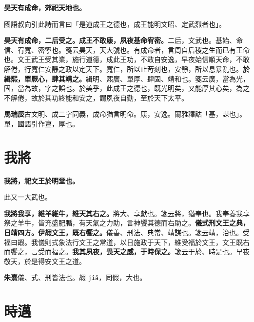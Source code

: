 
\textbf{昊天有成命，郊祀天地也。}

\begin{quoting}國語叔向引此詩而言曰「是道成王之德也，成王能明文昭、定武烈者也」。\end{quoting}

\textbf{昊天有成命，二后受之。成王不敢康，夙夜基命宥密。}{\footnotesize 二后，文武也。基始、命信、宥寬、密寧也。箋云昊天，天大號也。有成命者，言周自后稷之生而已有王命也。文王武王受其業，施行道德，成此王功，不敢自安逸，早夜始信順天命，不敢解倦，行寬仁安靜之政以定天下。寬仁，所以止苛刻也，安靜，所以息暴亂也。}\textbf{於緝熙，單厥心，肆其靖之。}{\footnotesize 緝明、熙廣、單厚、肆固、靖和也。箋云廣，當為光，固，當為故，字之誤也。於美乎，此成王之德也，既光明矣，又能厚其心矣，為之不解倦，故於其功終能和安之，謂夙夜自勤，至於天下太平。}

\begin{quoting}\textbf{馬瑞辰}古文明、成二字同義，成命猶言明命。康，安逸。爾雅釋詁「基，謀也」。單，國語引作亶，厚也。\end{quoting}

\section{我將}


\textbf{我將，祀文王於明堂也。}

\begin{quoting}此又一大武也。\end{quoting}

\textbf{我將我享，維羊維牛，維天其右之。}{\footnotesize 將大、享獻也。箋云將，猶奉也。我奉養我享祭之羊牛，皆充盛肥腯，有天氣之力助，言神饗其德而右助之。}\textbf{儀式刑文王之典，日靖四方。伊嘏文王，既右饗之。}{\footnotesize 儀善、刑法、典常、靖謀也。箋云靖，治也。受福曰嘏。我儀則式象法行文王之常道，以日施政于天下，維受福於文王，文王既右而饗之，言受而福之。}\textbf{我其夙夜，畏天之威，于時保之。}{\footnotesize 箋云于於、時是也。早夜敬天，於是得安文王之道。}

\begin{quoting}\textbf{朱熹}儀、式、刑皆法也。嘏 \texttt{jiǎ}，同假，大也。\end{quoting}

\section{時邁}

